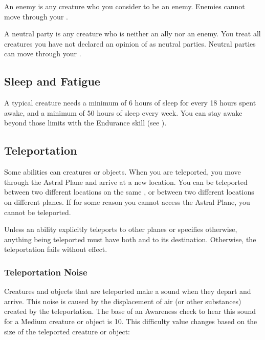          An enemy is any creature who you consider to be an enemy.
        Enemies cannot move through your .

         A neutral party is any creature who is neither an ally nor an enemy.
        You treat all creatures you have not declared an opinion of as neutral parties.
        Neutral parties can move through your .

    \subsection{Sleep and Fatigue}\label{Sleep and Fatigue}
        A typical creature needs a minimum of 6 hours of sleep for every 18 hours spent awake, and a minimum of 50 hours of sleep every week.
        You can stay awake beyond those limits with the Endurance skill (see ).

    \subsection{Teleportation}\label{Teleportation}
        Some abilities can  creatures or objects.
        When you are teleported, you move through the Astral Plane and arrive at a new location.
        You can be teleported between two different locations on the same , or between two different locations on different planes.
        If for some reason you cannot access the Astral Plane, you cannot be teleported.

        Unless an ability explicitly teleports to other planes or specifies otherwise, anything being teleported must have both  and  to its destination.
        Otherwise, the teleportation fails without effect.

        \subsubsection{Teleportation Noise}\label{Teleportation Noise}
            Creatures and objects that are teleported make a sound when they depart and arrive.
            This noise is caused by the displacement of air (or other substances) created by the teleportation.
            The base  of an Awareness check to hear this sound for a Medium creature or object is 10.
            This difficulty value changes based on the size of the teleported creature or object:

